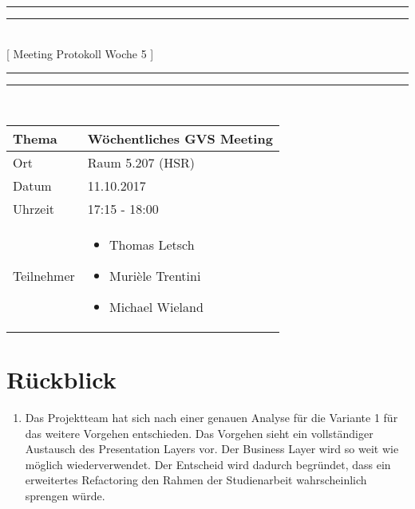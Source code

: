 \documentclass[11pt, a4paper,oneside]{scrartcl}
\begin{document}
\centering
\rule{\textwidth}{1.6pt}\vspace*{-\baselineskip}\vspace*{2pt} %
\rule{\textwidth}{0.4pt}\\[\baselineskip] %
{\LARGE [ Meeting Protokoll Woche 5 ]}\\[0.2\baselineskip] %
\rule{\textwidth}{0.4pt}\vspace*{-\baselineskip}\vspace{3.2pt} %
\rule{\textwidth}{1.6pt}\\[2\baselineskip] %

\begin{tabu} to \linewidth {l X }
	\toprule
	\textbf{Thema} & \textbf{Wöchentliches GVS Meeting} \\
	\midrule
	Ort & Raum 5.207 (HSR) \\
	Datum & 11.10.2017 \\
	Uhrzeit & 17:15 - 18:00 \\
	Teilnehmer & 
	\begin{minipage}[t]{\textwidth}
	  	\begin{itemize}
	  		\item Thomas Letsch
			\item Murièle Trentini
			\item Michael Wieland
	  	\end{itemize}
	\end{minipage}
	\\
	\bottomrule
\end{tabu}


\section{Rückblick}
\begin{enumerate}
	\item Das Projektteam hat sich nach einer genauen Analyse für die Variante 1 für das weitere Vorgehen entschieden. Das Vorgehen sieht ein vollständiger Austausch des Presentation Layers vor. Der Business Layer wird so weit wie möglich wiederverwendet. Der Entscheid wird dadurch begründet, dass ein erweitertes Refactoring den Rahmen der Studienarbeit wahrscheinlich sprengen würde.  
\end{enumerate}
\end{document}
